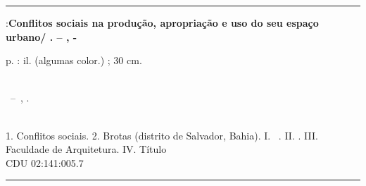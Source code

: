 \documentclass[
	12pt,					%
	openright,			%
	twoside,			%
	a4paper,			%
	english,				%
	french,				%
	spanish,			%
	brazil				%
	]{abntex2}
\newcommand{\subtitulo}{\bfseries Conflitos sociais na produção, apropriação e uso do seu espaço urbano}
\begin{document}
\setcounter{page}{2}





%
%     
\begin{fichacatalografica}
		\vspace*{\fill}					%
	\hrule							%
	\begin{center}					%
	\begin{minipage}[c]{12.5cm}		%
	
	\imprimirautor
	
	\hspace{0.5cm} \imprimirtitulo:\subtitulo  / \imprimirautor. --
	\imprimirlocal, \imprimirdata-
	
	\hspace{0.5cm} \pageref{LastPage} p. : il. (algumas color.) ; 30 cm.\\
	
	\hspace{0.5cm} \imprimirorientador~\imprimirorientador\\
	
	\hspace{0.5cm}
	\parbox[t]{\textwidth}{\imprimirtipotrabalho~--~\imprimirinstituicao,
	\imprimirdata.}\\
	
	\hspace{0.5cm}
		1. Conflitos sociais.
		2. Brotas (distrito de Salvador, Bahia).
		I. \imprimirorientador~\imprimirorientador.
		II. \imprimirinstituicao.
		III. Faculdade de Arquitetura.
		IV. Título\\ 			
	
	\hspace{8.75cm} CDU 02:141:005.7\\
	
	\end{minipage}
	\end{center}
	\hrule
\end{fichacatalografica}
\end{document}
